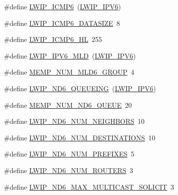 \begin{DoxyCompactItemize}
\item 
\#define \hyperlink{group__lwip__opts__icmp6_ga65ac8bcbad242cba3a2b557e1574b21f}{L\+W\+I\+P\+\_\+\+I\+C\+M\+P6}~(\hyperlink{openmote-cc2538_2lwip_2test_2fuzz_2lwipopts_8h_a872e3bb3fe2212156d66b18fccc9643f}{L\+W\+I\+P\+\_\+\+I\+P\+V6})
\item 
\#define \hyperlink{group__lwip__opts__icmp6_gaa88c55e37e5d7b865b91a9399313bbbf}{L\+W\+I\+P\+\_\+\+I\+C\+M\+P6\+\_\+\+D\+A\+T\+A\+S\+I\+ZE}~8
\item 
\#define \hyperlink{group__lwip__opts__icmp6_ga82193577b4045e1ac1533c4341a2bd79}{L\+W\+I\+P\+\_\+\+I\+C\+M\+P6\+\_\+\+HL}~255
\item 
\#define \hyperlink{group__lwip__opts__mld6_ga44d8f24eaebbc50221ac1336212a3528}{L\+W\+I\+P\+\_\+\+I\+P\+V6\+\_\+\+M\+LD}~(\hyperlink{openmote-cc2538_2lwip_2test_2fuzz_2lwipopts_8h_a872e3bb3fe2212156d66b18fccc9643f}{L\+W\+I\+P\+\_\+\+I\+P\+V6})
\item 
\#define \hyperlink{group__lwip__opts__mld6_ga89e92d8de8898696e797f13fdd169494}{M\+E\+M\+P\+\_\+\+N\+U\+M\+\_\+\+M\+L\+D6\+\_\+\+G\+R\+O\+UP}~4
\item 
\#define \hyperlink{group__lwip__opts__nd6_ga0757a3c1b5d1563ad2d77228e1d8a60f}{L\+W\+I\+P\+\_\+\+N\+D6\+\_\+\+Q\+U\+E\+U\+E\+I\+NG}~(\hyperlink{openmote-cc2538_2lwip_2test_2fuzz_2lwipopts_8h_a872e3bb3fe2212156d66b18fccc9643f}{L\+W\+I\+P\+\_\+\+I\+P\+V6})
\item 
\#define \hyperlink{group__lwip__opts__nd6_gabfaf3d92d51e2a9d70c8360af2611fb2}{M\+E\+M\+P\+\_\+\+N\+U\+M\+\_\+\+N\+D6\+\_\+\+Q\+U\+E\+UE}~20
\item 
\#define \hyperlink{group__lwip__opts__nd6_gab2fe15bdb4e0a41f295eb5577b11ad16}{L\+W\+I\+P\+\_\+\+N\+D6\+\_\+\+N\+U\+M\+\_\+\+N\+E\+I\+G\+H\+B\+O\+RS}~10
\item 
\#define \hyperlink{group__lwip__opts__nd6_gacad118b1ae886e80137a1d4f0fb19672}{L\+W\+I\+P\+\_\+\+N\+D6\+\_\+\+N\+U\+M\+\_\+\+D\+E\+S\+T\+I\+N\+A\+T\+I\+O\+NS}~10
\item 
\#define \hyperlink{group__lwip__opts__nd6_gad9cc576b5951f1b5e1c2b0d0bb831d9a}{L\+W\+I\+P\+\_\+\+N\+D6\+\_\+\+N\+U\+M\+\_\+\+P\+R\+E\+F\+I\+X\+ES}~5
\item 
\#define \hyperlink{group__lwip__opts__nd6_ga75e81a96148f266c8fad8c0bcab2f36a}{L\+W\+I\+P\+\_\+\+N\+D6\+\_\+\+N\+U\+M\+\_\+\+R\+O\+U\+T\+E\+RS}~3
\item 
\#define \hyperlink{group__lwip__opts__nd6_ga980909018aed54adc10dd68be3572b30}{L\+W\+I\+P\+\_\+\+N\+D6\+\_\+\+M\+A\+X\+\_\+\+M\+U\+L\+T\+I\+C\+A\+S\+T\+\_\+\+S\+O\+L\+I\+C\+IT}~3

\end{DoxyCompactItemize}
